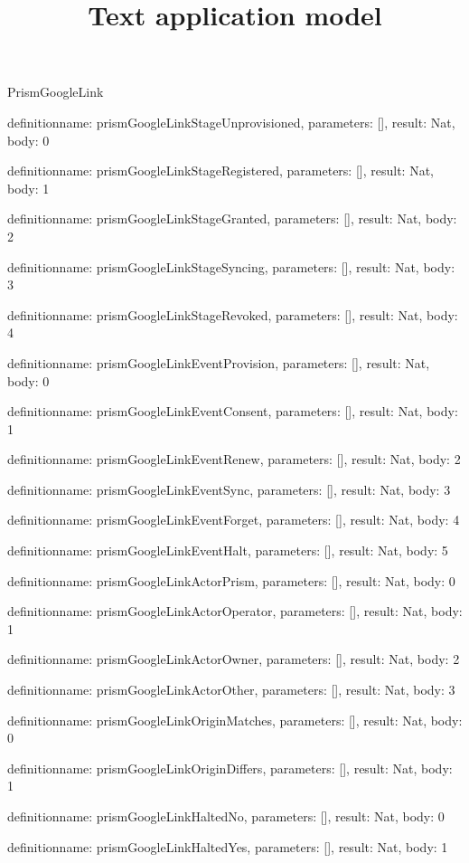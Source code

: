 \begin{lexlean}{PrismGoogleLink}
\title{Text application model}
\begin{semanticmodule}
definition{name: prismGoogleLinkStageUnprovisioned, parameters: [], result: Nat, body: 0}

definition{name: prismGoogleLinkStageRegistered, parameters: [], result: Nat, body: 1}

definition{name: prismGoogleLinkStageGranted, parameters: [], result: Nat, body: 2}

definition{name: prismGoogleLinkStageSyncing, parameters: [], result: Nat, body: 3}

definition{name: prismGoogleLinkStageRevoked, parameters: [], result: Nat, body: 4}

definition{name: prismGoogleLinkEventProvision, parameters: [], result: Nat, body: 0}

definition{name: prismGoogleLinkEventConsent, parameters: [], result: Nat, body: 1}

definition{name: prismGoogleLinkEventRenew, parameters: [], result: Nat, body: 2}

definition{name: prismGoogleLinkEventSync, parameters: [], result: Nat, body: 3}

definition{name: prismGoogleLinkEventForget, parameters: [], result: Nat, body: 4}

definition{name: prismGoogleLinkEventHalt, parameters: [], result: Nat, body: 5}

definition{name: prismGoogleLinkActorPrism, parameters: [], result: Nat, body: 0}

definition{name: prismGoogleLinkActorOperator, parameters: [], result: Nat, body: 1}

definition{name: prismGoogleLinkActorOwner, parameters: [], result: Nat, body: 2}

definition{name: prismGoogleLinkActorOther, parameters: [], result: Nat, body: 3}

definition{name: prismGoogleLinkOriginMatches, parameters: [], result: Nat, body: 0}

definition{name: prismGoogleLinkOriginDiffers, parameters: [], result: Nat, body: 1}

definition{name: prismGoogleLinkHaltedNo, parameters: [], result: Nat, body: 0}

definition{name: prismGoogleLinkHaltedYes, parameters: [], result: Nat, body: 1}


\end{semanticmodule}
\end{lexlean}
